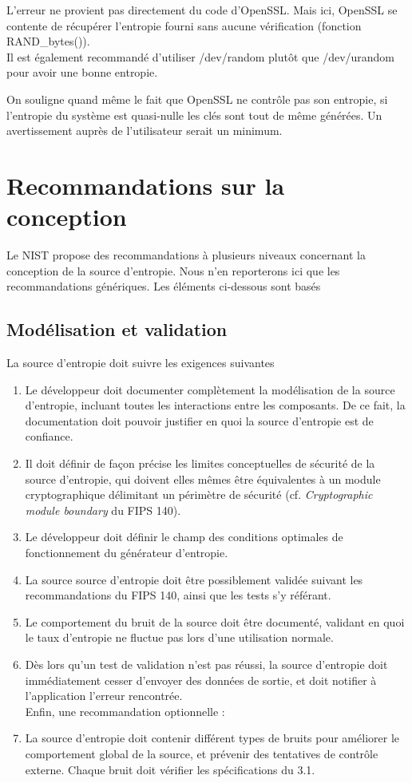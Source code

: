 			L'erreur ne provient pas directement du code d'OpenSSL.
			Mais ici, OpenSSL se contente de récupérer l'entropie fourni
			sans aucune vérification (fonction RAND\_bytes()).\\
			
			Il est également recommandé d'utiliser /dev/random plutôt que
			/dev/urandom pour avoir une bonne entropie.
			
			On souligne quand même le fait que OpenSSL ne contrôle pas
			son entropie, si l'entropie du système est quasi-nulle les
			clés sont tout de même générées. Un avertissement auprès de
			l'utilisateur serait un minimum.
			
\section{Recommandations sur la conception}
Le NIST propose des recommandations à plusieurs niveaux concernant la conception de la source d'entropie. Nous n'en reporterons ici que les recommandations génériques. Les éléments ci-dessous sont basés 

\subsection{Modélisation et validation}
La source d'entropie doit suivre les exigences suivantes 
\begin{enumerate}
\item Le développeur doit documenter complètement la modélisation de la source d'entropie, incluant toutes les interactions entre les composants. De ce fait, la documentation doit pouvoir justifier en quoi la source d'entropie est de confiance. 
\item Il doit définir de façon précise les limites conceptuelles de sécurité de la source d'entropie, qui doivent elles mêmes être équivalentes à un module cryptographique délimitant un périmètre de sécurité (cf. \textit{Cryptographic module boundary} du FIPS 140).
\item Le développeur doit définir le champ des conditions optimales de fonctionnement du générateur d'entropie.
\item La source source d'entropie doit être possiblement validée suivant les recommandations du FIPS 140, ainsi que les tests s'y référant.
\item Le comportement du bruit de la source doit être documenté, validant en quoi le taux d'entropie ne fluctue pas lors d'une utilisation normale.
\item Dès lors qu'un test de validation n'est pas réussi, la source d'entropie doit immédiatement cesser d'envoyer des données de sortie, et doit notifier à l'application l'erreur rencontrée.\\

Enfin, une recommandation optionnelle : 
\item La source d'entropie doit contenir différent types de bruits pour améliorer le comportement global de la source, et prévenir des tentatives de contrôle externe. Chaque bruit doit vérifier les spécifications du 3.1. 
\end{enumerate}

